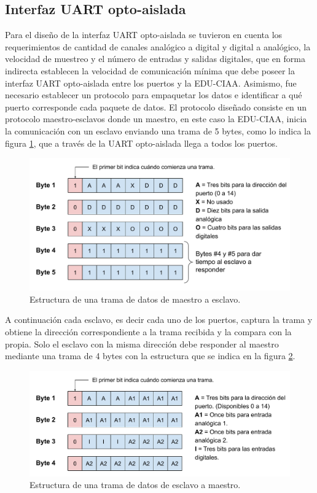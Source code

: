 \subsection{Interfaz UART opto-aislada}
\label{sec:UARTopto}
	
Para el diseño de la interfaz UART opto-aislada se tuvieron en cuenta los requerimientos de cantidad de canales analógico a digital y digital a analógico, la velocidad de muestreo y el número de entradas y salidas digitales, que en forma indirecta establecen la velocidad de comunicación mínima que debe poseer la interfaz UART opto-aislada entre los puertos y la EDU-CIAA.
Asimismo, fue necesario establecer un protocolo para empaquetar los datos e identificar a qué puerto corresponde cada paquete de datos.
El protocolo diseñado consiste en un protocolo maestro-esclavos donde un maestro, en este caso la EDU-CIAA, inicia la comunicación con un esclavo enviando una trama de 5 bytes, como lo indica la figura \ref{fig:TramaMS}, que a través de la UART opto-aislada llega a todos los puertos.

\begin{figure}[H]
	\centering
	\includegraphics[width=1\textwidth]{./Figures/TramaMS.pdf}
	\caption{Estructura de una trama de datos de maestro a esclavo.}
	\label{fig:TramaMS}
\end{figure}

A continuación cada esclavo, es decir cada uno de los puertos, captura la trama y obtiene la dirección correspondiente a la trama recibida y la compara con la propia. Solo el esclavo con la misma dirección debe responder al maestro mediante una trama de 4 bytes con la estructura que se indica en la figura \ref{fig:TramaSM}.

\begin{figure}[H]
	\centering
	\includegraphics[width=1\textwidth]{./Figures/TramaSM.pdf}
	\caption{Estructura de una trama de datos de esclavo a maestro.}
	\label{fig:TramaSM}
\end{figure}

